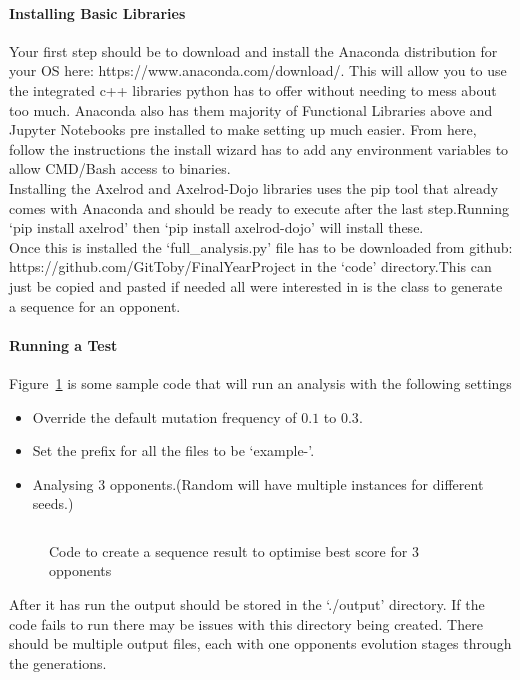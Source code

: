 \paragraph{Installing Basic Libraries}
Your first step should be to download and install the Anaconda distribution for your OS here: https://www.anaconda.com/download/.
This will allow you to use the integrated c++ libraries python has to offer without needing to mess about too much.
Anaconda also has them majority of Functional Libraries above and Jupyter Notebooks pre installed to make setting up much easier.
From here, follow the instructions the install wizard has to add any environment variables to allow CMD/Bash access to binaries.\\ 

Installing the Axelrod and Axelrod-Dojo libraries uses the pip tool that already comes with Anaconda and should be ready to execute after the last step.Running `pip install axelrod' then `pip install axelrod-dojo' will install these.\\

Once this is installed the `full\_analysis.py' file has to be downloaded from github: https://github.com/GitToby/FinalYearProject in the `code' directory.This can just be copied and pasted if needed all were interested in is the class to generate a sequence for an opponent.

\paragraph{Running a Test}
Figure~\ref{code:analysisExample} is some sample code that will run an analysis with the following settings
\begin{itemize}
    \item Override the default mutation frequency of \(0.1\) to \(0.3\).
    \item Set the prefix for all the files to be `example-'.
    \item Analysing 3 opponents.(Random will have multiple instances for different seeds.) 
\end{itemize}
\begin{figure}[ht]
    \centering
    \inputminted{python}{code_snippets/analysisExample.py}
    \caption{Code to create a sequence result to optimise best score for 3 opponents}\label{code:analysisExample}
\end{figure}

After it has run the output should be stored in the `./output' directory.
If the code fails to run there may be issues with this directory being created.
There should be multiple output files, each with one opponents evolution stages through the generations.


